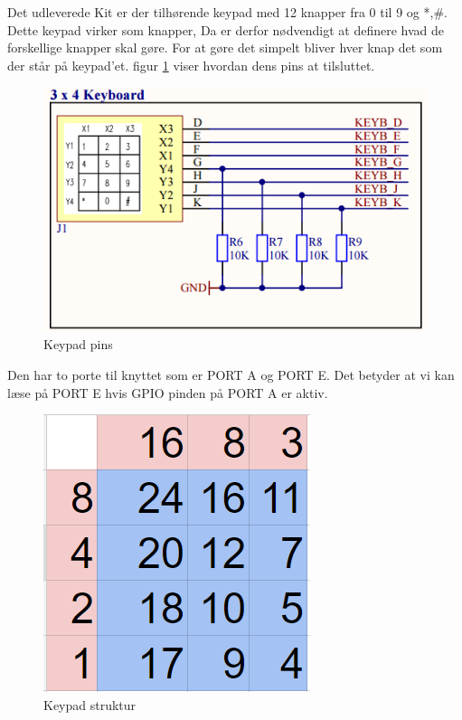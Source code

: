 Det udleverede Kit er der tilhørende keypad med 12 knapper fra 0 til 9 og *,\#. Dette keypad virker som knapper, Da er derfor nødvendigt at definere hvad de forskellige knapper skal gøre. For at gøre det simpelt bliver hver knap det som der står på keypad'et. figur \ref{fig:Keypadpins} viser hvordan dens pins at tilsluttet.
\begin{figure}[ht]
	\begin{center}
		\includegraphics[scale=0.7]{Billeder/Keypadpins.PNG}
	\end{center}
\caption{Keypad pins}
\label{fig:Keypadpins}
\end{figure}
Den har to porte til knyttet som er PORT A og PORT E. Det betyder at vi kan læse på PORT E hvis GPIO pinden på PORT A er aktiv.
\begin{figure}[ht]
	\begin{center}
		\includegraphics[scale=0.7]{Billeder/Keypad.PNG}
	\end{center}
\caption{Keypad struktur}
\label{fig:Keypad}
\end{figure}


